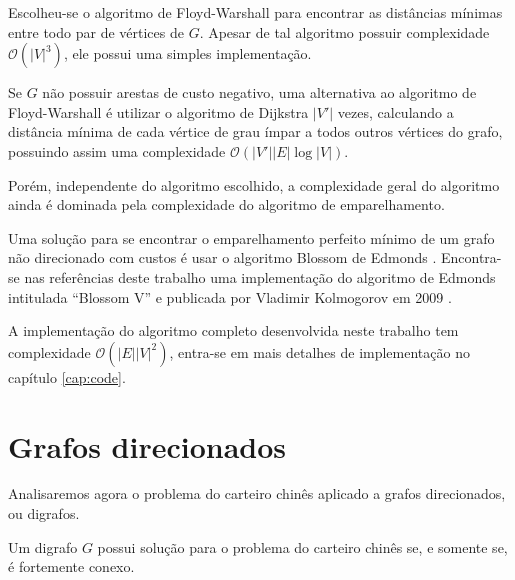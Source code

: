 Escolheu-se o algoritmo de Floyd-Warshall para encontrar as distâncias mínimas entre todo par de vértices de $G$.
Apesar de tal algoritmo possuir complexidade $\mathcal{O}(|V|^3)$, ele possui uma simples implementação.

Se $G$ não possuir arestas de custo negativo, uma alternativa ao algoritmo de Floyd-Warshall é utilizar o algoritmo de Dijkstra $|V'|$ vezes, calculando a distância mínima de cada vértice de grau ímpar a todos outros vértices do grafo, possuindo assim uma complexidade $\mathcal{O}(|V'||E|\log|V|)$. 

Porém, independente do algoritmo escolhido, a complexidade geral do algoritmo ainda é dominada pela complexidade do algoritmo de emparelhamento.

Uma solução para se encontrar o emparelhamento perfeito mínimo de um grafo não direcionado com custos é usar o algoritmo Blossom de Edmonds \cite{blossom}. 
Encontra-se nas referências deste trabalho uma implementação do algoritmo de Edmonds intitulada ``Blossom V'' e publicada por Vladimir Kolmogorov em 2009 \cite{kolmogorov}.

A implementação do algoritmo completo desenvolvida neste trabalho tem complexidade $\mathcal{O}(|E||V|^2)$, entra-se em mais detalhes de implementação no capítulo \ref{cap:code}.

    \section{Grafos direcionados}

    Analisaremos agora o problema do carteiro chinês aplicado a grafos direcionados, ou digrafos.

    \begin{lemma}
        Um digrafo $G$ possui solução para o problema do carteiro chinês se, e somente se, é fortemente conexo.
    \end{lemma}

